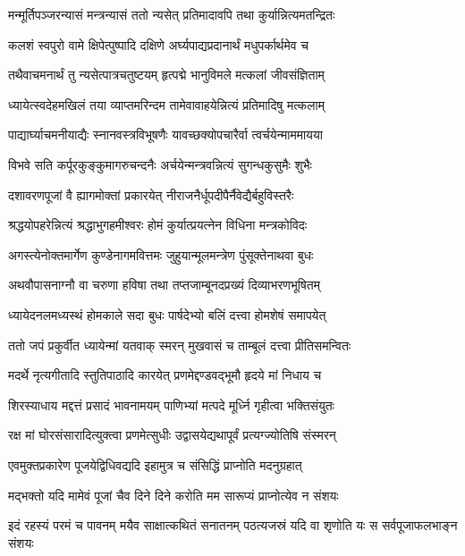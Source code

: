 \twolineshloka
{मन्मूर्तिपञ्जरन्यासं मन्त्रन्यासं ततो न्यसेत्}
{प्रतिमादावपि तथा कुर्यान्नित्यमतन्द्रितः} %

\twolineshloka
{कलशं स्वपुरो वामे क्षिपेत्पुष्पादि दक्षिणे}
{अर्घ्यपाद्यप्रदानार्थं मधुपर्कार्थमेव च} %

\twolineshloka
{तथैवाचमनार्थं तु न्यसेत्पात्रचतुष्टयम्}
{हृत्पद्मे भानुविमले मत्कलां जीवसंज्ञिताम्} %

\twolineshloka
{ध्यायेत्स्वदेहमखिलं तया व्याप्तमरिन्दम}
{तामेवावाहयेन्नित्यं प्रतिमादिषु मत्कलाम्} %

\twolineshloka
{पाद्यार्घ्याचमनीयाद्यैः स्नानवस्त्रविभूषणैः}
{यावच्छक्योपचारैर्वा त्वर्चयेन्माममायया} %

\twolineshloka
{विभवे सति कर्पूरकुङ्कुमागरुचन्दनैः}
{अर्चयेन्मन्त्रवन्नित्यं सुगन्धकुसुमैः शुभैः} %

\twolineshloka
{दशावरणपूजां वै ह्यागमोक्तां प्रकारयेत्}
{नीराजनैर्धूपदीपैर्नैवेद्यैर्बहुविस्तरैः} %

\twolineshloka
{श्रद्धयोपहरेन्नित्यं श्रद्धाभुगहमीश्वरः}
{होमं कुर्यात्प्रयत्नेन विधिना मन्त्रकोविदः} %

\twolineshloka
{अगस्त्येनोक्तमार्गेण कुण्डेनागमवित्तमः}
{जुहुयान्मूलमन्त्रेण पुंसूक्तेनाथवा बुधः} %

\twolineshloka
{अथवौपासनाग्नौ वा चरुणा हविषा तथा}
{तप्तजाम्बूनदप्रख्यं दिव्याभरणभूषितम्} %

\twolineshloka
{ध्यायेदनलमध्यस्थं होमकाले सदा बुधः}
{पार्षदेभ्यो बलिं दत्त्वा होमशेषं समापयेत्} %

\twolineshloka
{ततो जपं प्रकुर्वीत ध्यायेन्मां यतवाक् स्मरन्}
{मुखवासं च ताम्बूलं दत्त्वा प्रीतिसमन्वितः} %

\twolineshloka
{मदर्थे नृत्यगीतादि स्तुतिपाठादि कारयेत्}
{प्रणमेद्दण्डवद्भूमौ हृदये मां निधाय च} %

\twolineshloka
{शिरस्याधाय मद्दत्तं प्रसादं भावनामयम्}
{पाणिभ्यां मत्पदे मूर्ध्नि गृहीत्वा भक्तिसंयुतः} %

\twolineshloka
{रक्ष मां घोरसंसारादित्युक्त्वा प्रणमेत्सुधीः}
{उद्वासयेद्यथापूर्वं प्रत्यग्ज्योतिषि संस्मरन्} %

\twolineshloka
{एवमुक्तप्रकारेण पूजयेद्विधिवद्यदि}
{इहामुत्र च संसिद्धिं प्राप्नोति मदनुग्रहात्} %

\twolineshloka
{मद्भक्तो यदि मामेवं पूजां चैव दिने दिने}
{करोति मम सारूप्यं प्राप्नोत्येव न संशयः} %

\fourlineindentedshloka
{इदं रहस्यं परमं च पावनम्}
{मयैव साक्षात्कथितं सनातनम्}
{पठत्यजस्रं यदि वा शृणोति यः}
{स सर्वपूजाफलभाङ्न संशयः} %

